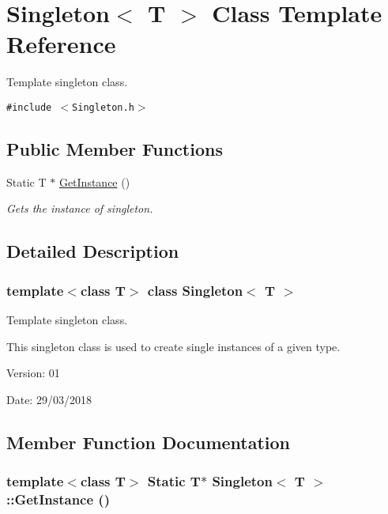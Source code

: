 \hypertarget{class_singleton}{
\section{Singleton$<$ T $>$ Class Template Reference}
\label{class_singleton}
}
Template singleton class.  


{\tt \#include $<$Singleton.h$>$}

\subsection*{Public Member Functions}
\begin{CompactItemize}
\item 
Static T $\ast$ \hyperlink{class_singleton_cc947ffd8470f2b8050db362b112f596}{GetInstance} ()
\begin{CompactList}\small\item\em Gets the instance of singleton. \item\end{CompactList}\end{CompactItemize}


\subsection{Detailed Description}
\subsubsection*{template$<$class T$>$ class Singleton$<$ T $>$}

Template singleton class. 

This singleton class is used to create single instances of a given type.

\begin{Desc}
\item[Version:]01 \end{Desc}
\begin{Desc}
\item[Date:]29/03/2018 \end{Desc}


\subsection{Member Function Documentation}
\hypertarget{class_singleton_cc947ffd8470f2b8050db362b112f596}{
\subsubsection[GetInstance]{\setlength{\rightskip}{0pt plus 5cm}template$<$class T$>$ Static T$\ast$ {\bf Singleton}$<$ T $>$::GetInstance ()}}
\label{class_singleton_cc947ffd8470f2b8050db362b112f596}


